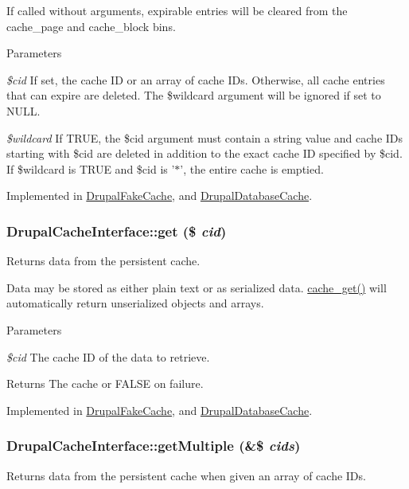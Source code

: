 If called without arguments, expirable entries will be cleared from the cache\_\-page and cache\_\-block bins.


\begin{DoxyParams}{Parameters}
\item[{\em \$cid}]If set, the cache ID or an array of cache IDs. Otherwise, all cache entries that can expire are deleted. The \$wildcard argument will be ignored if set to NULL. \item[{\em \$wildcard}]If TRUE, the \$cid argument must contain a string value and cache IDs starting with \$cid are deleted in addition to the exact cache ID specified by \$cid. If \$wildcard is TRUE and \$cid is '$\ast$', the entire cache is emptied. \end{DoxyParams}


Implemented in \hyperlink{classDrupalFakeCache_a524fb90590bc66f8dd8960e6f93de943}{DrupalFakeCache}, and \hyperlink{classDrupalDatabaseCache_a07b7a236787af4e11615f26dd98f51f7}{DrupalDatabaseCache}.\hypertarget{interfaceDrupalCacheInterface_ad5e2988b3cb4633f473ebf0f889d088f}{
\subsubsection[{get}]{\setlength{\rightskip}{0pt plus 5cm}DrupalCacheInterface::get (\$ {\em cid})}}
\label{interfaceDrupalCacheInterface_ad5e2988b3cb4633f473ebf0f889d088f}
Returns data from the persistent cache.

Data may be stored as either plain text or as serialized data. \hyperlink{includes_2cache_8inc_a9d873815c28909b61c3a6188b383f8a3}{cache\_\-get()} will automatically return unserialized objects and arrays.


\begin{DoxyParams}{Parameters}
\item[{\em \$cid}]The cache ID of the data to retrieve.\end{DoxyParams}
\begin{DoxyReturn}{Returns}
The cache or FALSE on failure. 
\end{DoxyReturn}


Implemented in \hyperlink{classDrupalFakeCache_aaab8fb6e1a78691e81e0f3d48d4edbad}{DrupalFakeCache}, and \hyperlink{classDrupalDatabaseCache_a66a573f6f3e13198b1e95fdc4bd14f8e}{DrupalDatabaseCache}.\hypertarget{interfaceDrupalCacheInterface_aee8c869921fff61654d12099237763dc}{
\subsubsection[{getMultiple}]{\setlength{\rightskip}{0pt plus 5cm}DrupalCacheInterface::getMultiple (\&\$ {\em cids})}}
\label{interfaceDrupalCacheInterface_aee8c869921fff61654d12099237763dc}
Returns data from the persistent cache when given an array of cache IDs.


